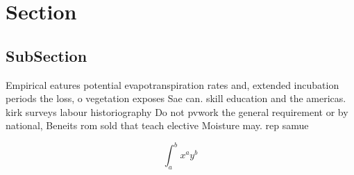 \documentclass[a4paper]{article}
\begin{document}
\section{Section}

\subsection{SubSection}

Empirical eatures potential evapotranspiration rates and, extended incubation periods the loss, o vegetation exposes Sae can. skill education and the americas. kirk surveys labour historiography Do not pvwork the general requirement or by national, Beneits rom sold that teach elective Moisture may. rep samue

\[ \int_{a}^{b}{x^{a}y^{b}} \]
\end{document}
